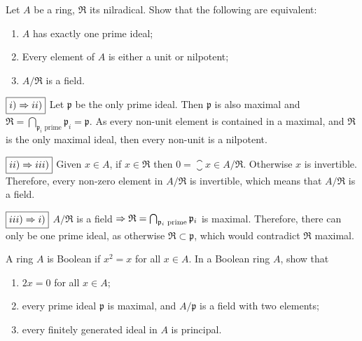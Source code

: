 \begin{ex}
	Let $A$ be a ring, $\mathfrak{R}$ its nilradical. Show that the following are equivalent:
	\begin{enumerate}[label=(\roman*)]
		\item $A$ has exactly one prime ideal;
		\item Every element of $A$ is either a unit or nilpotent;
		\item $A/\mathfrak{R}$ is a field.
	\end{enumerate}
\end{ex}

\begin{sol}
	$\boxed{i) \Rightarrow ii)}$ Let $\mathfrak{p}$ be the only prime ideal. Then $\mathfrak{p}$ is also maximal and $\mathfrak{R} = \bigcap_{\mathfrak{p}_i \text{ prime}} \mathfrak{p}_i = \mathfrak{p}$. As every non-unit element is contained in a maximal, and $\mathfrak{R}$ is the only maximal ideal, then every non-unit is a nilpotent.

	\vspace{3mm}

	\noindent $\boxed{ii) \Rightarrow iii)}$ Given $x \in A$, if $x \in \mathfrak{R}$ then $0 = \closure{x} \in A/\mathfrak{R}$. Otherwise $x$ is invertible. Therefore, every non-zero element in $A/\mathfrak{R}$ is invertible, which means that $A/\mathfrak{R}$ is a field.

	\vspace{3mm}

	\noindent $\boxed{iii) \Rightarrow i)}$ $A/\mathfrak{R}$ is a field $\Rightarrow \mathfrak{R} = \bigcap_{\mathfrak{p}_i \text{ prime}} \mathfrak{p}_i$ is maximal. Therefore, there can only be one prime ideal, as otherwise $\mathfrak{R} \subset \mathfrak{p}$, which would contradict $\mathfrak{R}$ maximal.
\end{sol}

\begin{ex}
	A ring $A$ is Boolean if $x^2 = x$ for all $x \in A$. In a Boolean ring $A$, show that
	\begin{enumerate}[label=(\roman*)]
		\item $2x = 0$ for all $x \in A$;
		\item every prime ideal $\mathfrak{p}$ is maximal, and $A/\mathfrak{p}$ is a field with two elements;
		\item every finitely generated ideal in $A$ is principal.
	\end{enumerate}
\end{ex}

